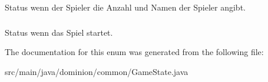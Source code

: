 \-Status wenn der \-Spieler die \-Anzahl und \-Namen der \-Spieler angibt. \hypertarget{enumdominion_1_1common_1_1GameState_a032950f49707dd83459b2f70bec317d6}{
\subsubsection[{\-Start}]{}}\label{enumdominion_1_1common_1_1GameState_a032950f49707dd83459b2f70bec317d6}
\-Status wenn das \-Spiel startet. 

\-The documentation for this enum was generated from the following file\-:\begin{DoxyCompactItemize}
\item 
src/main/java/dominion/common/\-Game\-State.\-java\end{DoxyCompactItemize}
